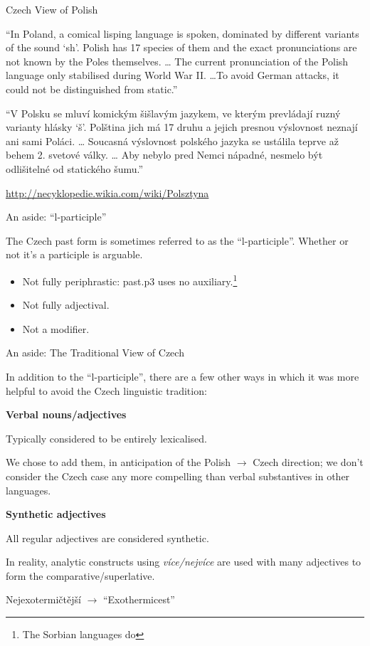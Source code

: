 \documentclass{beamer}
\begin{document}
\begin{frame}{Czech View of Polish}

\begin{center}
``In Poland, a comical lisping language is spoken, dominated by different 
variants of the sound `sh'. Polish has 17 species of them and the exact 
pronunciations are not known by the Poles themselves. \ldots
The current pronunciation of the Polish language only stabilised during 
World War II. \ldots To avoid German attacks, it could not be distinguished 
from static.''
\end{center}

\hbox{}

{\footnotesize
``V Polsku se mluví komickým šišlavým jazykem, ve kterým prevládají ruzný 
varianty hlásky `š'. Polština jich má 17 druhu a jejich presnou výslovnost 
neznají ani sami Poláci. \ldots
Soucasná výslovnost polského jazyka se ustálila teprve až behem 2. svetové 
války.
\ldots
Aby nebylo pred Nemci nápadné, nesmelo být odlišitelné od statického šumu.''}

\url{http://necyklopedie.wikia.com/wiki/Polsztyna}

\end{frame}

\begin{frame}{An aside: ``l-participle''}

The Czech past form is sometimes referred to as the ``l-participle''.
Whether or not it's a participle is arguable.

\begin{itemize}
\item Not fully periphrastic: past.p3 uses no auxiliary.\footnote{The Sorbian languages do}
\item Not fully adjectival.
\item Not a modifier.
\end{itemize}
\end{frame}

\begin{frame}{An aside: The Traditional View of Czech}

In addition to the ``l-participle'', there are a few other
ways in which it was more helpful to avoid the Czech linguistic
tradition:

\textbf{Verbal nouns/adjectives}

Typically considered to be entirely lexicalised.

We chose to add them, in anticipation of the Polish $\rightarrow$ Czech
direction; we don't consider the Czech case any more compelling
than verbal substantives in other languages.

\textbf{Synthetic adjectives}

All regular adjectives are considered synthetic.

In reality, analytic constructs using \emph{více/nejvíce} are
used with many adjectives to form the comparative/superlative.

Nejexotermičtější $\rightarrow$ ``Exothermicest''
\end{frame}
\end{document}
